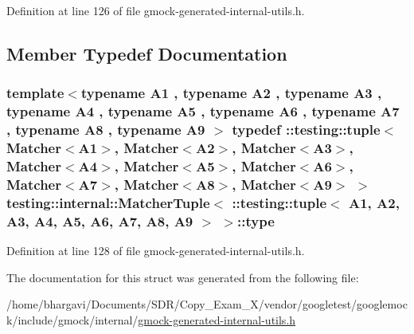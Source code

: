 Definition at line 126 of file gmock-\/generated-\/internal-\/utils.\+h.



\subsection{Member Typedef Documentation}
\subsubsection[{\texorpdfstring{type}{type}}]{\setlength{\rightskip}{0pt plus 5cm}template$<$typename A1 , typename A2 , typename A3 , typename A4 , typename A5 , typename A6 , typename A7 , typename A8 , typename A9 $>$ typedef \+::testing\+::tuple$<${\bf Matcher}$<$A1$>$, {\bf Matcher}$<$A2$>$, {\bf Matcher}$<$A3$>$, {\bf Matcher}$<$A4$>$, {\bf Matcher}$<$A5$>$, {\bf Matcher}$<$A6$>$, {\bf Matcher}$<$A7$>$, {\bf Matcher}$<$A8$>$, {\bf Matcher}$<$A9$>$ $>$ {\bf testing\+::internal\+::\+Matcher\+Tuple}$<$ \+::testing\+::tuple$<$ A1, A2, A3, A4, A5, A6, A7, A8, A9 $>$ $>$\+::{\bf type}}\hypertarget{structtesting_1_1internal_1_1_matcher_tuple_3_01_1_1testing_1_1tuple_3_01_a1_00_01_a2_00_01_a3_05ce0d9708ffc0cc1f9fec180f9f8202e_a022b424844dde9c01e4e40716be48f9f}{}\label{structtesting_1_1internal_1_1_matcher_tuple_3_01_1_1testing_1_1tuple_3_01_a1_00_01_a2_00_01_a3_05ce0d9708ffc0cc1f9fec180f9f8202e_a022b424844dde9c01e4e40716be48f9f}


Definition at line 128 of file gmock-\/generated-\/internal-\/utils.\+h.



The documentation for this struct was generated from the following file\+:\begin{DoxyCompactItemize}
\item 
/home/bhargavi/\+Documents/\+S\+D\+R/\+Copy\+\_\+\+Exam\+\_\+X/vendor/googletest/googlemock/include/gmock/internal/\hyperlink{gmock-generated-internal-utils_8h}{gmock-\/generated-\/internal-\/utils.\+h}\end{DoxyCompactItemize}
